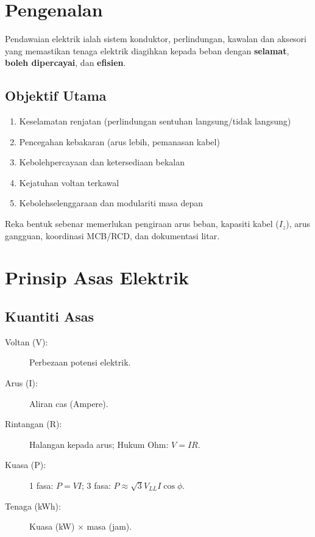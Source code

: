 \documentclass[12pt,a4paper,oneside]{scrreprt}
\newcommand{\nota}[1]{\begin{tcolorbox}[colframe=AccentBlue,title=Nota Penting]#1\end{tcolorbox}}
\begin{document}
\tableofcontents
\listoftables

\clearpage
{}

\chapter{Pengenalan}
Pendawaian elektrik ialah sistem konduktor, perlindungan, kawalan dan aksesori yang memastikan tenaga elektrik diagihkan kepada beban dengan \textbf{selamat}, \textbf{boleh dipercayai}, dan \textbf{efisien}. 
\section{Objektif Utama}
\begin{enumerate}
  \item Keselamatan renjatan (perlindungan sentuhan langsung/tidak langsung)
  \item Pencegahan kebakaran (arus lebih, pemanasan kabel)
  \item Kebolehpercayaan dan ketersediaan bekalan
  \item Kejatuhan voltan terkawal
  \item Kebolehselenggaraan dan modulariti masa depan
\end{enumerate}

\nota{Reka bentuk sebenar memerlukan pengiraan arus beban, kapasiti kabel ($I_z$), arus gangguan, koordinasi MCB/RCD, dan dokumentasi litar.}

\chapter{Prinsip Asas Elektrik}
\section{Kuantiti Asas}
\begin{description}
  \item[Voltan (V):] Perbezaan potensi elektrik.
  \item[Arus (I):] Aliran cas (Ampere).
  \item[Rintangan (R):] Halangan kepada arus; Hukum Ohm: $V = I R$.
  \item[Kuasa (P):] 1 fasa: $P = VI$; 3 fasa: $P \approx \sqrt{3} V_{LL} I \cos\phi$.
  \item[Tenaga (kWh):] Kuasa (kW) $\times$ masa (jam).
\end{description}
\end{document}
